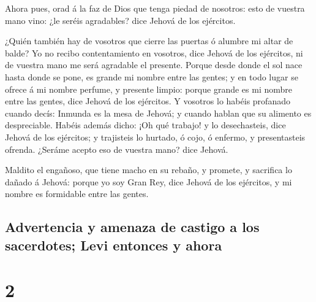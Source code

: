  Ahora pues, orad á la faz de Dios que tenga piedad de
nosotros: esto de vuestra mano vino: ¿le seréis agradables? dice Jehová
de los ejércitos.

 ¿Quién también hay de vosotros que cierre las puertas ó
alumbre mi altar de balde? Yo no recibo contentamiento en vosotros, dice
Jehová de los ejércitos, ni de vuestra mano me será agradable el
presente.  Porque desde donde el sol nace hasta donde se
pone, es grande mi nombre entre las gentes; y en todo lugar se ofrece á
mi nombre perfume, y presente limpio: porque grande es mi nombre entre
las gentes, dice Jehová de los ejércitos.  Y vosotros lo
habéis profanado cuando decís: Inmunda es la mesa de Jehová; y cuando
hablan que su alimento es despreciable.  Habéis además
dicho: ¡Oh qué trabajo! y lo desechasteis, dice Jehová de los ejércitos;
y trajisteis lo hurtado, ó cojo, ó enfermo, y presentasteis ofrenda.
¿Seráme acepto eso de vuestra mano? dice Jehová.

 Maldito el engañoso, que tiene macho en su rebaño, y
promete, y sacrifica lo dañado á Jehová: porque yo soy Gran Rey, dice
Jehová de los ejércitos, y mi nombre es formidable entre las gentes.

\hypertarget{advertencia-y-amenaza-de-castigo-a-los-sacerdotes-levi-entonces-y-ahora}{%
\subsection{Advertencia y amenaza de castigo a los sacerdotes; Levi
entonces y
ahora}\label{advertencia-y-amenaza-de-castigo-a-los-sacerdotes-levi-entonces-y-ahora}}

\hypertarget{section-1}{%
\section{2}\label{section-1}}

